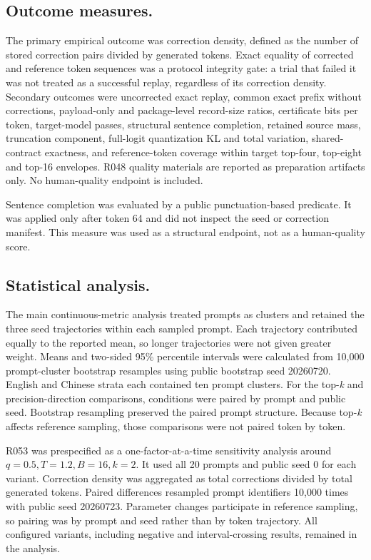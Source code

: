 \documentclass{nature}
\begin{document}
\begin{methods}
\subsection{Outcome measures.}
The primary empirical outcome was correction density, defined as the number of stored correction pairs divided by generated tokens. Exact equality of corrected and reference token sequences was a protocol integrity gate: a trial that failed it was not treated as a successful replay, regardless of its correction density. Secondary outcomes were uncorrected exact replay, common exact prefix without corrections, payload-only and package-level record-size ratios, certificate bits per token, target-model passes, structural sentence completion, retained source mass, truncation component, full-logit quantization KL and total variation, shared-contract exactness, and reference-token coverage within target top-four, top-eight and top-16 envelopes. R048 quality materials are reported as preparation artifacts only. No human-quality endpoint is included.

Sentence completion was evaluated by a public punctuation-based predicate. It was applied only after token 64 and did not inspect the seed or correction manifest. This measure was used as a structural endpoint, not as a human-quality score.

\subsection{Statistical analysis.}
The main continuous-metric analysis treated prompts as clusters and retained the three seed trajectories within each sampled prompt. Each trajectory contributed equally to the reported mean, so longer trajectories were not given greater weight. Means and two-sided 95\% percentile intervals were calculated from 10,000 prompt-cluster bootstrap resamples using public bootstrap seed 20260720. English and Chinese strata each contained ten prompt clusters. For the top-\textit{k} and precision-direction comparisons, conditions were paired by prompt and public seed. Bootstrap resampling preserved the paired prompt structure. Because top-\textit{k} affects reference sampling, those comparisons were not paired token by token.

R053 was prespecified as a one-factor-at-a-time sensitivity analysis around \(q=0.5,T=1.2,B=16,k=2\). It used all 20 prompts and public seed 0 for each variant. Correction density was aggregated as total corrections divided by total generated tokens. Paired differences resampled prompt identifiers 10,000 times with public seed 20260723. Parameter changes participate in reference sampling, so pairing was by prompt and seed rather than by token trajectory. All configured variants, including negative and interval-crossing results, remained in the analysis.


\end{methods}
\end{document}
